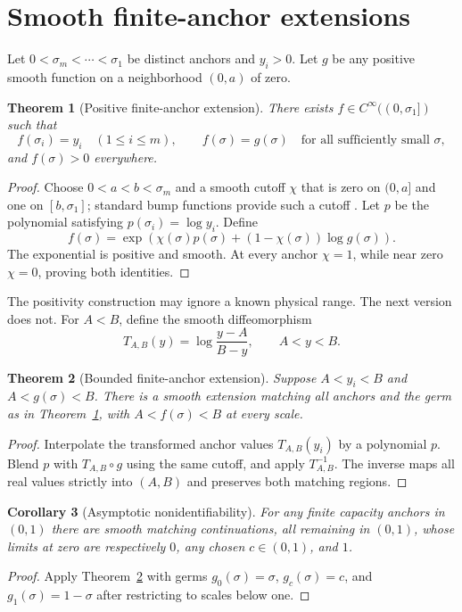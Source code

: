 \documentclass[12pt]{article}
\newtheorem{theorem}{Theorem}
\newtheorem{corollary}[theorem]{Corollary}
\begin{document}
\section{Smooth finite-anchor extensions}
Let $0<\sigma_m<\cdots<\sigma_1$ be distinct anchors and $y_i>0$.  Let $g$
be any positive smooth function on a neighborhood $(0,a)$ of zero.

\begin{theorem}[Positive finite-anchor extension]\label{thm:positive}
There exists $f\in C^\infty((0,\sigma_1])$ such that
\[
 f(\sigma_i)=y_i\quad(1\leq i\leq m),
 \qquad f(\sigma)=g(\sigma)\quad\text{for all sufficiently small }\sigma,
\]
and $f(\sigma)>0$ everywhere.
\end{theorem}
\begin{proof}
Choose $0<a<b<\sigma_m$ and a smooth cutoff $\chi$ that is zero on
$(0,a]$ and one on $[b,\sigma_1]$; standard bump functions provide such a
cutoff \citep{Hirsch1976}.  Let $p$ be the polynomial satisfying
$p(\sigma_i)=\log y_i$.  Define
\[
 f(\sigma)=\exp\!\left(\chi(\sigma)p(\sigma)
 +(1-\chi(\sigma))\log g(\sigma)\right).
\]
The exponential is positive and smooth.  At every anchor $\chi=1$, while
near zero $\chi=0$, proving both identities.
\end{proof}

The positivity construction may ignore a known physical range.  The next
version does not.  For $A<B$, define the smooth diffeomorphism
\[
 T_{A,B}(y)=\log\frac{y-A}{B-y},\qquad A<y<B.
\]

\begin{theorem}[Bounded finite-anchor extension]\label{thm:bounded}
Suppose $A<y_i<B$ and $A<g(\sigma)<B$.  There is a smooth extension matching
all anchors and the germ as in Theorem~\ref{thm:positive}, with
$A<f(\sigma)<B$ at every scale.
\end{theorem}
\begin{proof}
Interpolate the transformed anchor values
$T_{A,B}(y_i)$ by a polynomial $p$.  Blend $p$ with
$T_{A,B}\circ g$ using the same cutoff, and apply $T_{A,B}^{-1}$.  The inverse
maps all real values strictly into $(A,B)$ and preserves both matching
regions.
\end{proof}

\begin{corollary}[Asymptotic nonidentifiability]\label{cor:barrier}
For any finite capacity anchors in $(0,1)$ there are smooth matching
continuations, all remaining in $(0,1)$, whose limits at zero are respectively
$0$, any chosen $c\in(0,1)$, and $1$.
\end{corollary}
\begin{proof}
Apply Theorem~\ref{thm:bounded} with germs $g_0(\sigma)=\sigma$,
$g_c(\sigma)=c$, and $g_1(\sigma)=1-\sigma$ after restricting to scales below
one.
\end{proof}
\end{document}
